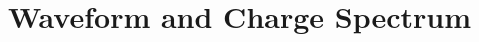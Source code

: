 \documentclass[11pt,compress,xcolor=x11names,UTF8]{beamer}
\begin{document}
%
%
\section{Waveform and Charge Spectrum}
%
\end{document}
